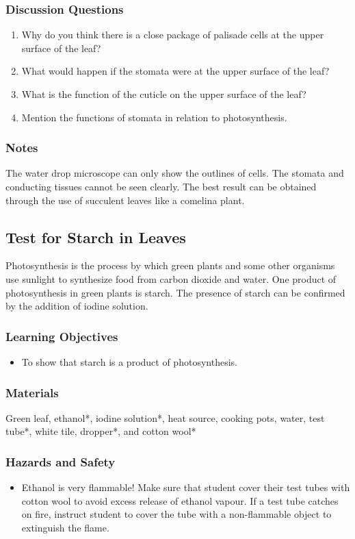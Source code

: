 \subsubsection*{Discussion Questions}
\begin{enumerate}
\item{Why do you think there is a close package of palisade cells at the upper surface of the leaf?}
\item{What would happen if the stomata were at the upper surface of the leaf?}
\item{What is the function of the cuticle on the upper surface of the leaf?}
\item{Mention the functions of stomata in relation to photosynthesis.}
\end{enumerate}

\subsubsection*{Notes}
The water drop microscope can only show the outlines of cells. The stomata and conducting tissues cannot be seen clearly. The best result can be obtained through the use of succulent leaves like a comelina plant.

\subsection{Test for Starch in Leaves}
Photosynthesis is the process by which green plants and some other organisms use sunlight to synthesize food from carbon dioxide and water. One product of photosynthesis in green plants is starch. The presence of starch can be confirmed by the addition of iodine solution.

\subsubsection*{Learning Objectives}
\begin{itemize}
\item{To show that starch is a product of photosynthesis.}
\end{itemize}

\subsubsection*{Materials}
Green leaf, ethanol*, iodine solution*, heat source, cooking pots, water, test tube*, white tile, dropper*, and cotton wool*

\subsubsection*{Hazards and Safety}
\begin{itemize}
\item{Ethanol is very flammable! Make sure that student cover their test tubes with cotton wool to avoid excess release of ethanol vapour. If a test tube catches on fire, instruct student to cover the tube with a non-flammable object to extinguish the flame.}
\end{itemize}

